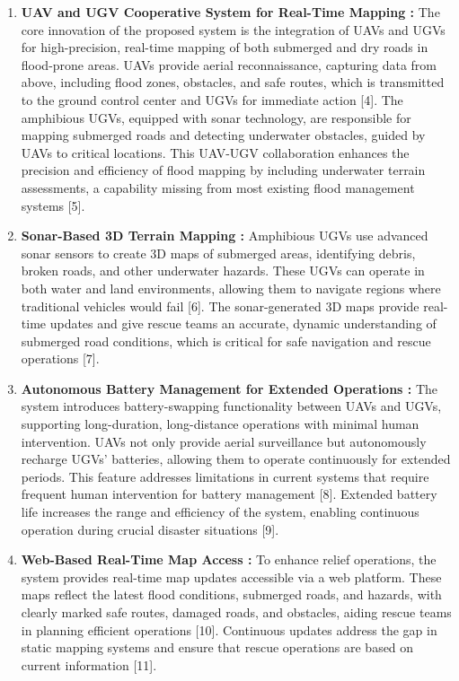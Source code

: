 \documentclass[conference]{IEEEtran}
\begin{document}
\begin{enumerate}
	\item \textbf{UAV and UGV Cooperative System for Real-Time Mapping : }
	The core innovation of the proposed system is the integration of UAVs and UGVs for high-precision, real-time mapping of both submerged and dry roads in flood-prone areas. UAVs provide aerial reconnaissance, capturing data from above, including flood zones, obstacles, and safe routes, which is transmitted to the ground control center and UGVs for immediate action [4]. The amphibious UGVs, equipped with sonar technology, are responsible for mapping submerged roads and detecting underwater obstacles, guided by UAVs to critical locations. This UAV-UGV collaboration enhances the precision and efficiency of flood mapping by including underwater terrain assessments, a capability missing from most existing flood management systems [5].
	
	\item \textbf{Sonar-Based 3D Terrain Mapping : }
Amphibious UGVs use advanced sonar sensors to create 3D maps of submerged areas, identifying debris, broken roads, and other underwater hazards. These UGVs can operate in both water and land environments, allowing them to navigate regions where traditional vehicles would fail [6]. The sonar-generated 3D maps provide real-time updates and give rescue teams an accurate, dynamic understanding of submerged road conditions, which is critical for safe navigation and rescue operations [7].	
	
	\item \textbf{Autonomous Battery Management for Extended Operations : }The system introduces battery-swapping functionality between UAVs and UGVs, supporting long-duration, long-distance operations with minimal human intervention. UAVs not only provide aerial surveillance but autonomously recharge UGVs' batteries, allowing them to operate continuously for extended periods. This feature addresses limitations in current systems that require frequent human intervention for battery management [8]. Extended battery life increases the range and efficiency of the system, enabling continuous operation during crucial disaster situations [9].
	
	
	\item \textbf{Web-Based Real-Time Map Access : }
To enhance relief operations, the system provides real-time map updates accessible via a web platform. These maps reflect the latest flood conditions, submerged roads, and hazards, with clearly marked safe routes, damaged roads, and obstacles, aiding rescue teams in planning efficient operations [10]. Continuous updates address the gap in static mapping systems and ensure that rescue operations are based on current information [11].	
	

\end{enumerate}
\end{document}
